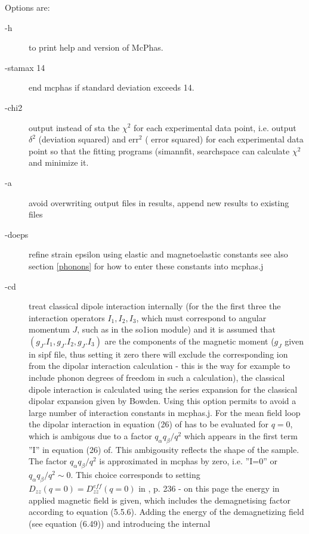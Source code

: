 Options are:
\begin{description}
\item[\prg   -h]  to  print help and version of {\prg McPhas}.
\item[\prg   -stamax 14]  end mcphas if standard deviation exceeds 14.
\item[\prg   -chi2] output instead of sta the $\chi^2$ for each experimental data point, i.e. output
               $\delta^2$ (deviation squared) and err$^2$ ( error squared) 
               for each experimental data point so that the fitting programs ({\prg simannfit, searchspace}
               can calculate $\chi^2$ and minimize it.
\item[\prg   -a] avoid overwriting output files in results, append new results to existing files
\item[\prg   -doeps] refine strain epsilon using elastic and magnetoelastic constants 
see also section \ref{phonons} for how to enter these constants into {\prg mcphas.j}
\item[\prg   -cd] treat classical dipole interaction internally  (for the the first three 
the interaction operators $I_1,I_2,I_3$, which must correspond to angular momentum $J$, such as in the so1ion module)
            and it
                 is assumed that $(g_J.I_1,g_J.I_2,g_J.I_3)$ are the components of the magnetic
 moment ($g_J$ given in sipf file, thus setting it zero there will exclude the
corresponding ion from the dipolar interaction calculation - this is the way for example to include 
phonon degrees of freedom in such a calculation),
  the classical dipole interaction is calculated using the series expansion for the classical dipolar expansion 
given by Bowden\cite{bowden81-827}. Using this option permits to avoid a large number of interaction constants in
{\prg mcphas.j}. For the mean field loop the dipolar interaction in equation (26) of\cite{bowden81-827} 
has to be evaluated for $q=0$, which is ambigous due to a factor $q_{\alpha}q_{\beta}/q^2$ which appears
in the first term ''I'' in equation (26) of\cite{bowden81-827}. This ambigousity reflects the shape
of the sample. The factor $q_{\alpha}q_{\beta}/q^2$ is approximated in {\prg mcphas} by zero, i.e. ''I=0'' or
 $q_{\alpha}q_{\beta}/q^2 \sim 0$. This choice corresponds to setting $D_{zz}(q=0)=D^{eff}_{zz}(q=0)$
in \cite{jensen91-1}, p. 236 - on this page the energy in applied magnetic field is given, which
includes the demagnetising factor according to equation (5.5.6). Adding the energy of the
demagnetizing field (see \cite{blundell01-1} equation (6.49)) and introducing the internal

\end{description}
